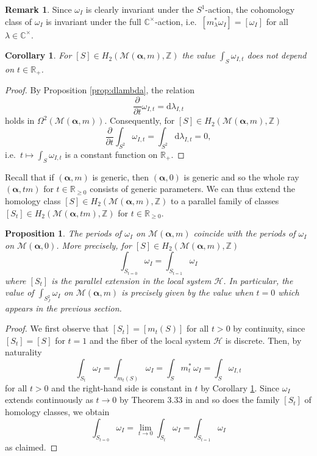 \documentclass[12pt,letterpaper,reqno]{amsart}
\def\mathbf#1{#1}%
\newtheorem{cor}[thm]{Corollary}
\newtheorem{prop}[thm]{Proposition}
\theoremstyle{remark}
\theoremstyle{definition}
\newtheorem{rem}[thm]{Remark}
\numberwithin{thm}{section}
\numberwithin{equation}{section}
\numberwithin{figure}{section}
\newcommand{\cM}{\ensuremath{\mathcal M}}
\newcommand{\R}{\ensuremath{\mathbb R}}
\newcommand{\C}{\ensuremath{\mathbb C}}
\newcommand{\Z}{\ensuremath{\mathbb Z}}
\newcommand{\calM}{\mathcal M}
\newcommand{\de}{\mathrm{d}}
\newcommand{\bsa}{\boldsymbol{\alpha}}
\newcommand{\bfm}{\mathbf{m}}
\begin{document}
\begin{rem}
Since $\omega_I$ is clearly invariant under the $S^1$-action, the cohomology class of $\omega_I$ is invariant under the full $\C^\times$-action, i.e.\ $[m_\lambda^* \omega_I] = [\omega_I]$ for all $\lambda \in \C^{\times}$.
\end{rem}


\begin{cor}\label{cor:const}
For $[S] \in H_2(\cM(\bsa, \bfm), \Z)$  the value $\int_S \omega_{I,t}$ does not depend on $t \in \R_+$.
\end{cor}

\begin{proof}
By Proposition \ref{prop:dlambda},
the relation 
\[
\frac{\partial}{\partial t} \omega_{I,t}= \de \lambda_{I,t}
\]
holds in $\Omega^2(\mathcal{M}(\boldsymbol{\alpha}, \mathbf{m}))$. Consequently, for $[S] \in H_2(\cM(\bsa, \bfm), \Z)$
\[\frac{\partial}{\partial t}\int_{S^2} \omega_{I,t}= \int_{S^2} \de \lambda_{I,t}= 0,\]
i.e.\ $t \mapsto \int_{S} \omega_{I,t}$ is a constant function on $\R_+$. 
\end{proof}

Recall that if $(\bsa, \bfm)$ is generic, then $(\bsa, \mathbf{0})$ is generic and so the whole ray $(\bsa, t\bfm)$ for $t \in \R_{\geq 0}$ consists of generic parameters.  We can thus extend the homology class $[S] \in H_2(\cM(\bsa, \bfm), \Z)$ to a parallel family of classes $[S_t]  \in H_2(\cM(\bsa, t\bfm), \Z)$ for $t \in \R_{\geq 0}$.


\begin{prop}\label{prop:sameperiods}
The periods of $\omega_I$ on $\calM(\bsa,\bfm)$ coincide with the periods of $\omega_I$ on $\calM(\bsa,\mathbf{0})$. More precisely, for $[S] \in H_2(\cM(\bsa, \bfm), \Z)$ 
 \[
 \int_{S_{t=0}} \omega_I = \int_{S_{t=1}} \omega_I
 \]
where $[S_t]$ is the parallel extension in the local system $\mathcal H$. In particular, the value of $\int_{S^2_J} \omega_I$ on $\calM(\bsa,\bfm)$ is precisely given by the value when $t=0$ which appears in the previous section.
\end{prop}

\begin{proof}
We first observe that $[S_t] =[m_t(S)]$ for all $t>0$ by continuity, since $[S_t]=[S]$ for $t=1$ and the fiber of the local system $\mathcal{H}$ is discrete.  Then, by naturality
\[
\int_{S_t} \omega_I = \int_{m_t(S)} \omega_I = \int_{S} m_t^* \, \omega_I = \int_{S} \omega_{I,t}  
\]
for all $t >0$ and the right-hand side is constant in $t$ by Corollary \ref{cor:const}. 
Since $\omega_I$ extends continuously as  $t \to 0$ by Theorem 3.33 in \cite{collier2024conformallimitsparabolicslnchiggs} and so does the family $[S_t]$ of homology classes, we obtain 
\[
\int_{S_{t=0}} \omega_I = \lim_{t \to 0} \int_{S_t} \omega_I = \int_{S_{t=1}} \omega_I
\]
as claimed.
\end{proof}
\end{document}
